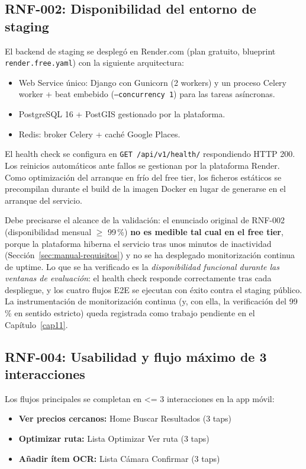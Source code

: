 \subsection{RNF-002: Disponibilidad del entorno de staging}\label{subsec:rnf02}

El backend de staging se despleg\'o en Render.com (plan gratuito, blueprint
\texttt{render.free.yaml}) con la siguiente arquitectura:
\begin{itemize}
  \item Web Service \'unico: Django con Gunicorn (2 workers) y un proceso Celery
    worker + beat embebido (\texttt{--concurrency 1}) para las tareas as\'incronas.
  \item PostgreSQL 16 + PostGIS gestionado por la plataforma.
  \item Redis: broker Celery + cach\'e Google Places.
\end{itemize}

El health check se configura en \texttt{GET /api/v1/health/} respondiendo HTTP 200. Los reinicios
autom\'aticos ante fallos se gestionan por la plataforma Render. Como optimizaci\'on del arranque
en fr\'io del free tier, los ficheros est\'aticos se precompilan durante el build de la imagen
Docker en lugar de generarse en el arranque del servicio.

Debe precisarse el alcance de la validaci\'on: el enunciado original de RNF-002 (disponibilidad
mensual $\geq$ 99\,\%) \textbf{no es medible tal cual en el free tier}, porque la plataforma
hiberna el servicio tras unos minutos de inactividad (Secci\'on~\ref{sec:manual-requisitos}) y
no se ha desplegado monitorizaci\'on continua de uptime. Lo que se ha verificado es la
\emph{disponibilidad funcional durante las ventanas de evaluaci\'on}: el health check responde
correctamente tras cada despliegue, y los cuatro flujos E2E se ejecutan con \'exito contra el
staging p\'ublico. La instrumentaci\'on de monitorizaci\'on continua (y, con ella, la
verificaci\'on del 99\,\% en sentido estricto) queda registrada como trabajo pendiente en el
Cap\'itulo~\ref{cap11}.

\subsection{RNF-004: Usabilidad y flujo m\'aximo de 3 interacciones}\label{subsec:rnf04}

Los flujos principales se completan en \textless{}= 3 interacciones en la app m\'ovil:

\begin{itemize}
  \item \textbf{Ver precios cercanos:} Home \textrightarrow{} Buscar \textrightarrow{} Resultados
    (3 taps)
  \item \textbf{Optimizar ruta:} Lista \textrightarrow{} Optimizar \textrightarrow{} Ver ruta
    (3 taps)
  \item \textbf{A\~nadir \'item OCR:} Lista \textrightarrow{} C\'amara \textrightarrow{} Confirmar
    (3 taps)
\end{itemize}

